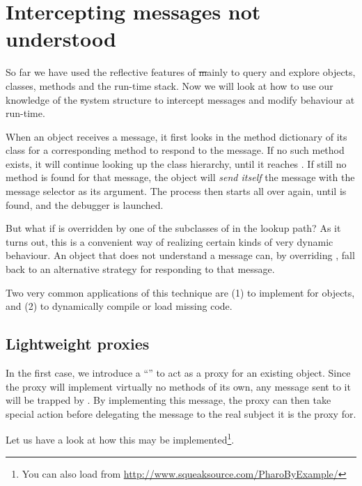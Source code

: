 \documentclass[a4paper,10pt,twoside]{book}
\begin{document}
\section{Intercepting messages not understood}

So far we have used the reflective features of \st mainly to query and explore objects, classes, methods and the run-time stack. Now we will look at how to use our knowledge of the \st system structure to intercept messages and modify behaviour at run-time.

When an object receives a message, it first looks in the method dictionary of its class for a corresponding method to respond to the message.
If no such method exists, it will continue looking up the class hierarchy, until it reaches . If still no method is found for that message, the object will \emph{send itself} the message  with the message selector as its argument.
The process then starts all over again, until  is found, and the debugger is launched.

But what if  is overridden by one of the subclasses of  in the lookup path?
As it turns out, this is a convenient way of realizing certain kinds of very dynamic behaviour. An object that does not understand a message can, by overriding , fall back to an alternative strategy for responding to that message.

Two very common applications of this technique are (1) to implement  for objects, and (2) to dynamically compile or load missing code.

\subsection{Lightweight proxies}

In the first case, we introduce a ``'' to act as a proxy for an existing object.
Since the proxy will implement virtually no methods of its own, any message sent to it will be trapped by . By implementing this message, the proxy can then take special action before delegating the message to the real subject it is the proxy for.

Let us have a look at how this may be implemented\footnote{You can also load  from \url{http://www.squeaksource.com/PharoByExample/}}.
\end{document}
